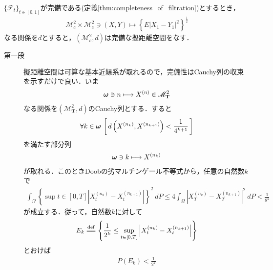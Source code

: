 	\begin{screen}
		\begin{thm}
		\label{thm:pseudo_metric_on_square_integrable_martingales}
			$\{\mathscr{F}_t\}_{t \in [0,1]}$が完備である(定義\ref{thm:completeness_of_filtration})とするとき，
			\begin{align}
				\mathscr{M}_{c}^{2} \times \mathscr{M}_{c}^{2} \ni (X,Y) \longmapsto
				\left\{E|X_{1}-Y_{1}|^2\right\}^{\frac{1}{2}}
			\end{align}
			なる関係を$d$とすると，$\left(\mathscr{M}_{c}^{2},d\right)$は完備な擬距離空間をなす．
		\end{thm}
	\end{screen}
	
	\begin{sketch}\mbox{}
		\begin{description}
			\item[第一段] 擬距離空間は可算な基本近縁系が取れるので，完備性はCauchy列の収束を示すだけで良い．いま
				\begin{align}
					{\boldsymbol \omega} \ni n \longmapsto X^{(n)} \in \mathscr{M}^2_{\mathbf{T}}
				\end{align}
				なる関係を$\left(\mathscr{M}^2_{\mathbf{T}},d\right)$のCauchy列とする．すると
				\begin{align}
					\forall k \in {\boldsymbol \omega}\, \left[\, d\left( X^{(n_k)},X^{(n_{k+1})} \right) < \frac{1}{4^{k+1}}\, \right]
				\end{align}
				を満たす部分列
				\begin{align}
					{\boldsymbol \omega} \ni k \longmapsto X^{(n_k)}
				\end{align}
				が取れる．このときDoobの劣マルチンゲール不等式から，任意の自然数$k$で
				\begin{align}
					\int_\Omega \left\{ \sup{t \in [0,T]}{\left|X_t^{(n_k)} - X_t^{(n_{k+1})}\right|} \right\}^2\ dP
					\leq 4 \int_\Omega \left|X_T^{(n_k)} - X_T^{(n_{k+1})}\right|^2\ dP
					< \frac{1}{8^k}
					\label{fom:thm_pseudo_metric_on_square_integrable_martingales_2}
				\end{align}
				が成立する．従って，自然数$k$に対して
				\begin{align}
					E_k \defeq \left\{ \frac{1}{2^k} \leq \sup{t \in [0,T]}{\left|X_t^{(n_k)} - X_t^{(n_{k+1})}\right|} \right\}
				\end{align}
				とおけば
				\begin{align}
					P(E_k) < \frac{1}{2^k}
				\end{align}

\end{description}
\end{sketch}
